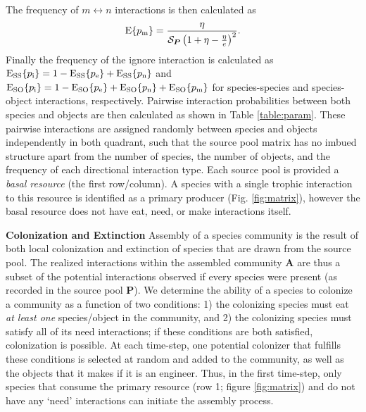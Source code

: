 \documentclass[twocolumn,preprintnumbers,amsmath,amssymb,superscriptaddress]{revtex4}
\newcommand{\rr}[1]{{\rm #1}}
\begin{document}
The frequency of $m \leftrightarrow n$ interactions is then calculated as
\begin{equation}
{\rm E}\{p_\rr{m}\} = \frac{\eta}{\mathcal{S}_{\bm P}\left(1 + \eta - \frac{\eta}{e}\right)^2}.
\end{equation}
Finally the frequency of the ignore interaction is calculated as $\rr{E_{SS}}\{p_\rr{i}\} = 1 - \rr{E_{SS}}\{p_\rr{e}\} + \rr{E_{SS}}\{p_\rr{n}\}$ and  $\rr{E_{SO}}\{p_\rr{i}\} = 1 - \rr{E_{SO}}\{p_\rr{e}\} + \rr{E_{SO}}\{p_\rr{n}\}+ \rr{E_{SO}}\{p_\rr{m}\}$ for species-species and species-object interactions, respectively.
Pairwise interaction probabilities between both species and objects are then calculated as shown in Table \ref{table:param}.
These pairwise interactions are assigned randomly between species and objects independently in both quadrant, such that the source pool matrix has no imbued structure apart from the number of species, the number of objects, and the frequency of each directional interaction type.
Each source pool is provided a \emph{basal resource} (the first row/column).
A species with a single trophic interaction to this resource is identified as a primary producer (Fig. \ref{fig:matrix}), however the basal resource does not have eat, need, or make interactions itself.


\textbf{Colonization and Extinction} Assembly of a species community is the result of both local colonization and extinction of species that are drawn from the source pool.
The realized interactions within the assembled community $\bm A$ are thus a subset of the potential interactions observed if every species were present (as recorded in the source pool $\bm P$). 
We determine the ability of a species to colonize a community as a function of two conditions:
1) the colonizing species must eat \emph{at least one} species/object in the community, and
2) the colonizing species must satisfy all of its need interactions; if these conditions are both satisfied, colonization is possible.
At each time-step, one potential colonizer that fulfills these conditions is selected at random and added to the community, as well as the objects that it makes if it is an engineer.
Thus, in the first time-step, only species that consume the primary resource (row 1; figure \ref{fig:matrix}) and do not have any `need' interactions can initiate the assembly process.
\end{document}
